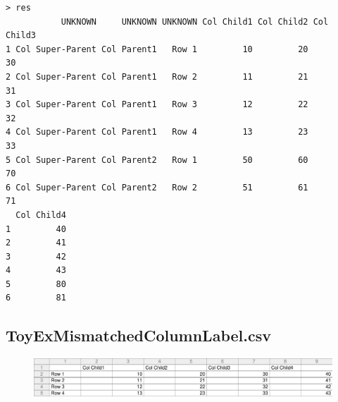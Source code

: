 \documentclass[a4paper]{article}
\begin{document}
\begin{verbatim}
> res 
           UNKNOWN     UNKNOWN UNKNOWN Col Child1 Col Child2 Col Child3
1 Col Super-Parent Col Parent1   Row 1         10         20         30
2 Col Super-Parent Col Parent1   Row 2         11         21         31
3 Col Super-Parent Col Parent1   Row 3         12         22         32
4 Col Super-Parent Col Parent1   Row 4         13         23         33
5 Col Super-Parent Col Parent2   Row 1         50         60         70
6 Col Super-Parent Col Parent2   Row 2         51         61         71
  Col Child4
1         40
2         41
3         42
4         43
5         80
6         81
\end{verbatim}

\newpage
\subsection{ToyExMismatchedColumnLabel.csv}
\label{sec:TCRO_ToyExMismatchedColumnLabel.csv}
\begin{figure}[!h]
\centering
\includegraphics[width=\textwidth]{./TestCase/ToyExMismatchedColumnLabel.pdf}
\end{figure}
\end{document}
